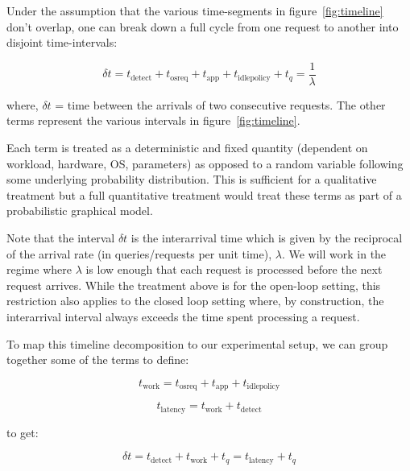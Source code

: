 

\newpage
{}
\label{sec:appendix}

Under the assumption that the various time-segments in figure~\ref{fig:timeline} don't overlap, one can break down a full cycle from one request to another into disjoint time-intervals:

\begin{equation}
\delta t = t_{\text{detect}} + t_{\text{osreq}} + t_{\text{app}} + t_{\text{idlepolicy}} + t_q = \frac{1}{\lambda}
\label{eq:time}
\end{equation}

where, $\delta t$ = time between the arrivals of two consecutive requests. The other terms represent the various intervals in figure~\ref{fig:timeline}.

Each term is treated as a deterministic and fixed quantity (dependent on workload, hardware, OS, parameters) as opposed to a random variable following some underlying probability distribution. This is sufficient for a qualitative treatment but a full quantitative treatment would treat these terms as part of a probabilistic graphical model.

Note that the interval $\delta t$ is the interarrival time which is given by the reciprocal of the arrival rate (in queries/requests per unit time), $\lambda$. We will work in the regime where $\lambda$ is low enough that each request is processed before the next request arrives. While the treatment above is for the open-loop setting, this restriction also applies to the closed loop setting where, by construction, the interarrival interval always exceeds the time spent processing a request.

To map this timeline decomposition to our experimental setup, we can group together some of the terms to define:

$$t_{\text{work}} = t_{\text{osreq}} + t_{\text{app}} + t_{\text{idlepolicy}}$$

$$t_{\text{latency}} = t_{\text{work}} + t_{\text{detect}}$$

to get:

$$\delta t = t_{\text{detect}} + t_{\text{work}} + t_q = t_{\text{latency}} + t_q$$

